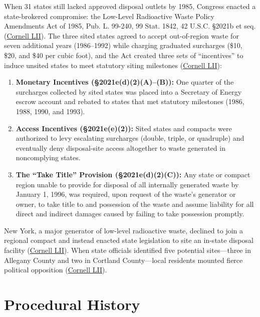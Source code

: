 \documentclass[12pt]{article}
\begin{document}
When 31 states still lacked approved disposal outlets by 1985, Congress enacted a state-brokered compromise: the Low-Level Radioactive Waste Policy Amendments Act of 1985, Pub. L. 99-240, 99 Stat. 1842, 42 U.S.C. \S 2021b et seq. (\href{https://www.law.cornell.edu/supremecourt/text/505/144}{Cornell LII}). The three sited states agreed to accept out-of-region waste for seven additional years (1986--1992) while charging graduated surcharges (\$10, \$20, and \$40 per cubic foot), and the Act created three sets of ``incentives'' to induce unsited states to meet statutory siting milestones (\href{https://www.law.cornell.edu/supremecourt/text/505/144}{Cornell LII}):
\begin{enumerate}
    \item \textbf{Monetary Incentives (\S 2021e(d)(2)(A)--(B)):} One quarter of the surcharges collected by sited states was placed into a Secretary of Energy escrow account and rebated to states that met statutory milestones (1986, 1988, 1990, and 1993).
    \item \textbf{Access Incentives (\S 2021e(e)(2)):} Sited states and compacts were authorized to levy escalating surcharges (double, triple, or quadruple) and eventually deny disposal-site access altogether to waste generated in noncomplying states.
    \item \textbf{The ``Take Title'' Provision (\S 2021e(d)(2)(C)):} Any state or compact region unable to provide for disposal of all internally generated waste by January 1, 1996, was required, upon request of the waste's generator or owner, to take title to and possession of the waste and assume liability for all direct and indirect damages caused by failing to take possession promptly.
\end{enumerate}

New York, a major generator of low-level radioactive waste, declined to join a regional compact and instead enacted state legislation to site an in-state disposal facility (\href{https://www.law.cornell.edu/supremecourt/text/505/144}{Cornell LII}). When state officials identified five potential sites---three in Allegany County and two in Cortland County---local residents mounted fierce political opposition (\href{https://www.law.cornell.edu/supremecourt/text/505/144}{Cornell LII}).

\section{Procedural History}
\end{document}
